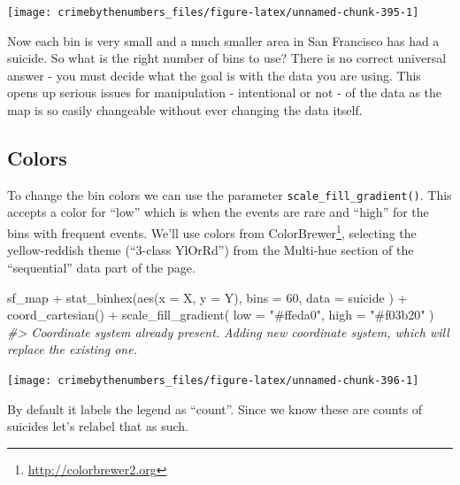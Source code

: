 \documentclass[
]{krantz}
\makeatletter
\newenvironment{Shaded}{\begin{snugshade}}{\end{snugshade}}
\newcommand{\AttributeTok}[1]{\textcolor[rgb]{0.61,0.61,0.61}{#1}}
\newcommand{\CommentTok}[1]{\textcolor[rgb]{0.37,0.37,0.37}{\textit{#1}}}
\newcommand{\DecValTok}[1]{\textcolor[rgb]{0.06,0.06,0.06}{#1}}
\newcommand{\FunctionTok}[1]{\textcolor[rgb]{0,0,0}{#1}}
\newcommand{\NormalTok}[1]{#1}
\newcommand{\SpecialCharTok}[1]{\textcolor[rgb]{0,0,0}{#1}}
\newcommand{\StringTok}[1]{\textcolor[rgb]{0.5,0.5,0.5}{#1}}
\renewcommand{\href}[2]{#2\footnote{\url{#1}}}
\newenvironment{kframe}{%
\medskip{}
\setlength{\fboxsep}{.8em}
 \def\at@end@of@kframe{}%
 \ifinner\ifhmode%
  \def\at@end@of@kframe{\end{minipage}}%
  \begin{minipage}{\columnwidth}%
 \fi\fi%
 \def\FrameCommand##1{\hskip\@totalleftmargin \hskip-\fboxsep
 \colorbox{shadecolor}{##1}\hskip-\fboxsep
     \hskip-\linewidth \hskip-\@totalleftmargin \hskip\columnwidth}%
 \MakeFramed {\advance\hsize-\width
   \@totalleftmargin\z@ \linewidth\hsize
   \@setminipage}}%
 {\par\unskip\endMakeFramed%
 \at@end@of@kframe}
\renewenvironment{Shaded}{\begin{kframe}}{\end{kframe}}
\makeatother
\begin{document}
\begin{center}\texttt{[image: crimebythenumbers\_files/figure-latex/unnamed-chunk-395-1]} \end{center}

Now each bin is very small and a much smaller area in San
Francisco has had a suicide. So what is the right number of
bins to use? There is no correct universal answer - you must
decide what the goal is with the data you are using. This
opens up serious issues for manipulation - intentional or
not - of the data as the map is so easily changeable without
ever changing the data itself.

\hypertarget{colors}{%
\subsection{Colors}\label{colors}}

To change the bin colors we can use the parameter
\texttt{scale\_fill\_gradient()}. This accepts a color for
``low'' which is when the events are rare and ``high'' for
the bins with frequent events. We'll use colors from
\href{http://colorbrewer2.org}{ColorBrewer}, selecting the
yellow-reddish theme (``3-class YlOrRd'') from the Multi-hue
section of the ``sequential'' data part of the page.

\begin{Shaded}
\begin{Highlighting}[]
\NormalTok{sf\_map }\SpecialCharTok{+}
  \FunctionTok{stat\_binhex}\NormalTok{(}\FunctionTok{aes}\NormalTok{(}\AttributeTok{x =}\NormalTok{ X, }\AttributeTok{y =}\NormalTok{ Y),}
    \AttributeTok{bins =} \DecValTok{60}\NormalTok{,}
    \AttributeTok{data =}\NormalTok{ suicide}
\NormalTok{  ) }\SpecialCharTok{+}
  \FunctionTok{coord\_cartesian}\NormalTok{() }\SpecialCharTok{+}
  \FunctionTok{scale\_fill\_gradient}\NormalTok{(}
    \AttributeTok{low =} \StringTok{"\#ffeda0"}\NormalTok{,}
    \AttributeTok{high =} \StringTok{"\#f03b20"}
\NormalTok{  )}
\CommentTok{\#\textgreater{} Coordinate system already present. Adding new coordinate system, which will replace the existing one.}
\end{Highlighting}
\end{Shaded}

\begin{center}\texttt{[image: crimebythenumbers\_files/figure-latex/unnamed-chunk-396-1]} \end{center}

By default it labels the legend as ``count''. Since we know
these are counts of suicides let's relabel that as such.
\end{document}
